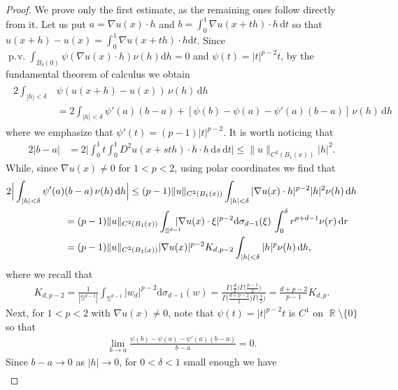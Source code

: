 \documentclass[12pt, reqno]{amsart}%
\theoremstyle{plain}  %
\theoremstyle{definition}  %
\numberwithin{equation}{section}
\DeclareMathOperator{\pv}{\operatorname{p.\!v.}}
\DeclareMathOperator{\R}{\mathbb{R}}
\renewcommand{\d}{\mathrm{d}}
\begin{document}
\begin{proof}
We prove only the first estimate, as the remaining ones follow directly from it.   Let us put $a=\nabla u(x)\cdot h$ and $b=\int_0^1\nabla u(x+th)\cdot h\, \d t$ so that $u(x+h)-u(x)= \int_0^1\nabla u(x+th)\cdot h\d t$. Since  $\pv \int_{B_\delta(0)} \psi(\nabla u(x)\cdot h)\nu(h)\d h=0$ and $\psi(t)= |t|^{p-2}t$, by the fundamental theorem of calculus we obtain
\begin{align}\label{eq:xxpsi-taylor-nearzero}
\begin{split}
2\int_{|h|<\delta} &\psi(u(x+h)-u(x))\,\nu(h)\,\d h
\\&= 2\int_{|h|<\delta } \psi'(a)(b-a)+ [\psi(b)-\psi(a)-\psi'(a)(b-a)]\,\nu(h)\,\d h
\end{split}
\end{align}
where we emphasize that $\psi'(t)= (p-1)|t|^{p-2}$. It is worth noticing that
\begin{align*}
2|b-a| &=2\Big| \int_0^1 t\int_0^1 D^2u(x+sth)\cdot h \cdot h\, \d s\,  \d t\Big|\leq \|u\|_{C^2(B_1(x))} |h|^2.
\end{align*}
While, since   $\nabla u(x)\neq 0$ for $1<p<2$, using polar coordinates we find that
\begin{align*}
 2\Big|\int_{|h|<\delta } \psi'(a)&(b-a)\,\nu(h)\,\d h\Big|
\leq (p-1)\|u\|_{C^2(B_1(x))}\int_{|h|<\delta }  |\nabla u(x)\cdot h|^{p-2}  |h|^2\nu(h)\,\d h\\
&= (p-1)\|u\|_{C^2(B_1(x))}\int_{\mathbb{S}^{d-1}}  \hspace*{-2ex}|\nabla u(x)\cdot \xi|^{p-2}  \d\sigma_{d-1}(\xi)\, \int_0^\delta r^{p+d-1}\nu(r)\,\d r\\
&= (p-1)\|u\|_{C^2(B_1(x))} |\nabla u(x)|^{p-2}K_{d,p-2} \int_{|h|<\delta } |h|^p\nu(h)\,\d h,
\end{align*}
where we recall that
\begin{align*}
K_{d,p-2}= \frac{1}{|\mathbb{S}^{d-1}|} \int_{\mathbb{S}^{d-1}} |w_d|^{p-2}\d \sigma_{d-1}(w)= \frac{ \Gamma\big(\frac{d}{2}\big)  \Gamma\big(\frac{p-1}{2}\big)}{\Gamma\big(\frac{d+p-2}{2}\big) \Gamma\big(\frac{1}{2}\big)}= \frac{d+p-2}{p-1} K_{d,p}.
\end{align*}
Next, for  $1<p<2$ with $\nabla u(x)\neq 0$, note that  $\psi(t)= |t|^{p-2}t $ is $C^1$ on $\R\setminus\{0\}$  so that
\begin{align*}
\lim_{b\to a}\frac{\psi(b)-\psi(a) -\psi'(a)(b-a)}{b-a}=0.
\end{align*}
Since $b- a\to0$ as $|h|\to 0$, for $0<\delta<1$ small enough we have
\begin{align*}

\end{align*}
\end{proof}
\end{document}
